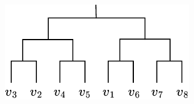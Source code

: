 \begin{figure}
\begin{minipage}{0.29\textwidth}
    \begin{subfigure}{\textwidth}
        \centering
        \includegraphics[width=\textwidth]{images/sfc_kdtree.svg.pdf}
        \caption{}
        \label{fig:sfc_kdtree}
    \end{subfigure}
\end{minipage}
\hfill
\begin{minipage}{0.13\textwidth}
    \begin{subfigure}[b]{\textwidth}
        \centering

\end{subfigure}
\end{minipage}
\end{figure}
